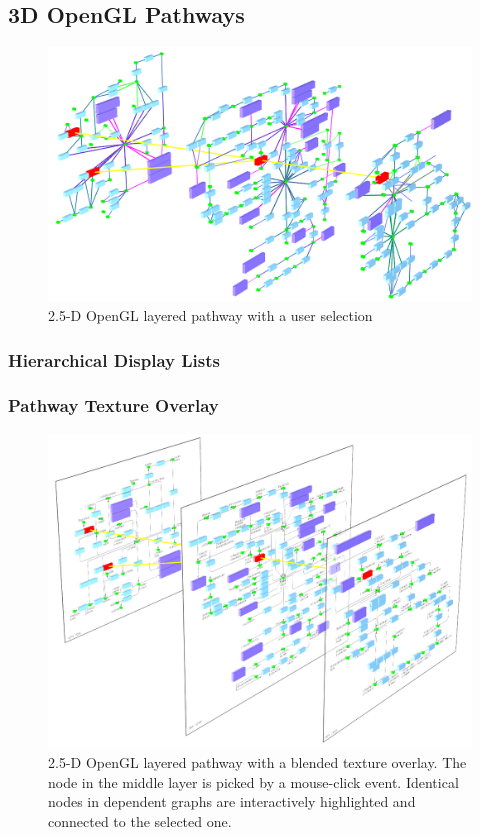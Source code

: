 \subsection{3D OpenGL Pathways}

\begin{figure}
  \centering
    \includegraphics[width=0.7\linewidth]{gfx/opengl_layered_pathway_without_texture}
  \caption{2.5-D OpenGL layered pathway with a user selection}
  \label{fig:opengl_layered_pathway_without_texture}
\end{figure}

\subsubsection{Hierarchical Display Lists}

\subsubsection{Pathway Texture Overlay}

\begin{figure}[ht]
  \centering
    \includegraphics[width=0.7\linewidth]{gfx/opengl_layered_pathway}
  \caption{2.5-D OpenGL layered pathway with a blended texture overlay. The node in the middle layer is picked by a mouse-click event. Identical nodes in dependent graphs are interactively highlighted and connected to the selected one.}
  \label{fig:opengl_layered_pathway}
\end{figure}

